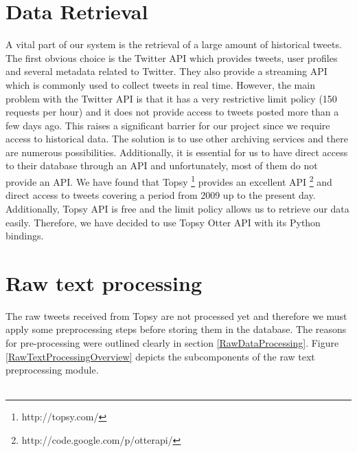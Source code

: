 \section{Data Retrieval}
A vital part of our system is the retrieval of a large amount of historical tweets. The first obvious choice is the Twitter API which provides tweets, user profiles and several metadata related to Twitter. They also provide a streaming API which is commonly used to collect tweets in real time. However, the main problem with the Twitter API is that it has a very restrictive limit policy (150 requests per hour) and it does not provide access to tweets posted more than a few days ago. This raises a significant barrier for our project since we require access to historical data. The solution is to use other archiving services and there are numerous possibilities. Additionally, it is essential for us to have direct access to their database through an API and unfortunately, most of them do not provide an API. We have found that Topsy \footnote{http://topsy.com/} provides an excellent API \footnote{http://code.google.com/p/otterapi/} and direct access to tweets covering a period from 2009 up to the present day. Additionally, Topsy API is free and the limit policy allows us to retrieve our data easily. Therefore, we have decided to use Topsy Otter API with its Python bindings.

\section{Raw text processing}
The raw tweets received from Topsy are not processed yet and therefore we must apply some preprocessing steps before storing them in the database. The reasons for pre-processing were outlined clearly in section \ref{RawDataProcessing}. Figure \ref{RawTextProcessingOverview} depicts the subcomponents of the raw text preprocessing module.\\\\

